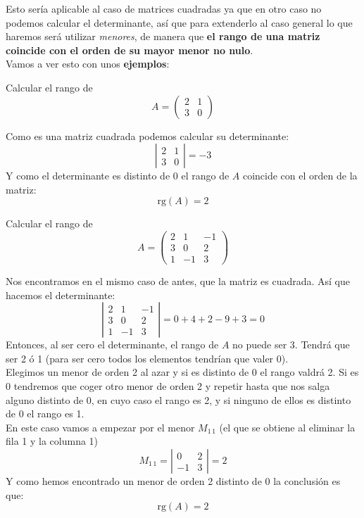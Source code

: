 \documentclass[a4paper,11pt,answers]{exam}
\newcommand\rango[1]{\mathrm{rg}(#1)}
\begin{document}
Esto sería aplicable al caso de matrices cuadradas ya que en otro caso no podemos calcular el determinante, así que para extenderlo al caso general lo que haremos será utilizar \emph{menores}, de manera que \textbf{el rango de una matriz coincide con el orden de su mayor menor no nulo}.\\

Vamos a ver esto con unos \textbf{ejemplos}:\\
\begin{questions}
\question Calcular el rango de 
\[A= \left(\begin{array}{rr}
2&1\\
3&0
\end{array}\right)\]
\begin{solution}
Como es una matriz cuadrada podemos calcular su determinante:
\[\left|\begin{array}{rr}
2&1\\
3&0
\end{array}\right| = -3\]
Y como el determinante es distinto de 0 el rango de $A$ coincide con el orden de la matriz:
\[\rango{A} = 2\]
\end{solution}

\question Calcular el rango de
\[A = \left(\begin{array}{rrr}
2&1&-1\\
3&0&2\\
1&-1&3
\end{array}\right)\]
\begin{solution}
Nos encontramos en el mismo caso de antes, que la matriz es cuadrada. Así que hacemos el determinante:
\[\left|\begin{array}{rrr}
2&1&-1\\
3&0&2\\
1&-1&3
\end{array}\right| = 0+4+2-9+3 = 0\]
Entonces, al ser cero el determinante, el rango de $A$ no puede ser 3. Tendrá que ser 2 ó 1 (para ser cero todos los elementos tendrían que valer 0).\\

Elegimos un menor de orden 2 al azar y si es distinto de 0 el rango valdrá 2. Si es 0 tendremos que coger otro menor de orden 2 y repetir hasta que nos salga alguno distinto de 0, en cuyo caso el rango es 2, y si ninguno de ellos es distinto de 0 el rango es 1.\\
En este caso vamos a empezar por el menor $M_{1\,1}$ (el que se obtiene al eliminar la fila 1 y la columna 1)
\[M_{1\,1} = \left|\begin{array}{rr}
0&2\\
-1&3
\end{array}\right| = 2\]
Y como hemos encontrado un menor de orden 2 distinto de 0 la conclusión es que:
\[\rango{A} = 2\]
\end{solution}


\end{questions}
\end{document}
